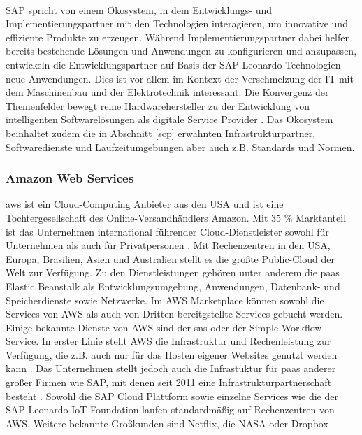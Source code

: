 \\SAP spricht von einem Ökosystem, in dem Entwicklungs- und Implementierungspartner mit den Technologien interagieren, um innovative und effiziente Produkte zu erzeugen. Während Implementierungspartner dabei helfen, bereits bestehende Lösungen und Anwendungen zu konfigurieren und anzupassen, entwickeln die Entwicklungspartner auf Basis der SAP-Leonardo-Technologien neue Anwendungen. Dies ist vor allem im Kontext der Verschmelzung der IT mit dem Maschinenbau und der Elektrotechnik interessant. Die Konvergenz der Themenfelder bewegt reine Hardwarehersteller zu der Entwicklung von intelligenten Softwarelösungen als digitale Service Provider \citep{Elsner2018}. Das Ökosystem beinhaltet zudem die in Abschnitt \ref{scp} erwähnten Infrastrukturpartner, Softwaredienste und Laufzeitumgebungen aber auch z.B. Standards und Normen.


\subsubsection{Amazon Web Services}

\acf{aws} ist ein Cloud-Computing Anbieter aus den USA und ist eine Tochtergesellschaft des Online-Versandhändlers Amazon. Mit 35 \% Marktanteil ist das Unternehmen international führender Cloud-Dienstleister sowohl für Unternehmen als auch für Privatpersonen \citep{awsms2019}. Mit Rechenzentren in den USA, Europa, Brasilien, Asien und Australien stellt es die größte Public-Cloud der Welt zur Verfügung. Zu den Dienstleistungen gehören unter anderem die \ac{paas} Elastic Beanstalk als Entwicklungsumgebung, Anwendungen, Datenbank- und Speicherdienste sowie Netzwerke. Im AWS Marketplace können sowohl die Services von AWS als auch von Dritten bereitgstellte Services gebucht werden. Einige bekannte Dienste von AWS sind der \acf{sns} oder der Simple Workflow Service. In erster Linie stellt AWS die Infrastruktur und Rechenleistung zur Verfügung, die z.B. auch nur für das Hosten eigener Websites genutzt werden kann \citep{AWS}. Das Unternehmen stellt jedoch auch die Infrastuktur für \ac{paas} anderer großer Firmen wie SAP, mit denen seit 2011 eine Infrastrukturpartnerschaft besteht \citep{Elsner2018}. Sowohl die SAP Cloud Plattform sowie einzelne Services wie die der SAP Leonardo IoT Foundation laufen standardmäßig auf Rechenzentren von AWS. Weitere bekannte Großkunden sind Netflix, die NASA oder Dropbox \citep{awsms2019}.



\newpage
